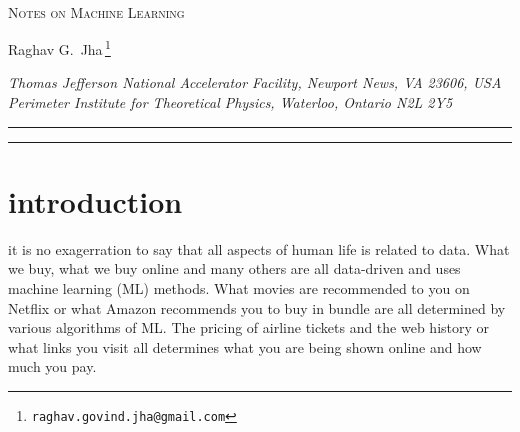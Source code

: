 \documentclass[11pt]{article}
\begin{document}
	\begin{titlepage}
		\setcounter{page}{1} \baselineskip=15.5pt \thispagestyle{empty}
		\bigskip\
		\vspace{1cm}
		\begin{center}
			{\fontsize{19}{38}\textsc{Notes on Machine Learning}}  %
		\end{center}
		\vspace{0.2cm}
		\begin{center}
			{\fontsize{12}{30}\selectfont Raghav G.~Jha\orcidA{}\,\footnote{\texttt{raghav.govind.jha@gmail.com}}}
		\end{center}
		
		
		\begin{center}
			\vskip 7pt
			\textsl{Thomas Jefferson National Accelerator Facility, Newport News, VA 23606, USA\\
			Perimeter Institute for Theoretical Physics, Waterloo, Ontario N2L 2Y5\\
				}
			\vskip 6pt
		\end{center}
		
		\vspace{2.6cm}
		\hrule \vspace{0.2cm}
\vspace{0.5cm}
\hrule

\vspace{0.5cm}		
		\tableofcontents
		\vspace{0.6cm}
	\end{titlepage}
	
	
	\section{introduction}
	
	it is no exagerration to say that all aspects of human life is related to data. What we buy, what we buy online and many others
	are all data-driven and uses machine learning (ML) methods. What movies are recommended to you on Netflix or what Amazon
	recommends you to buy in bundle are all determined by various algorithms of ML. The pricing of airline tickets and the web history 
	or what links you visit all determines what you are being shown online and how much you pay. 
	
\end{document}
